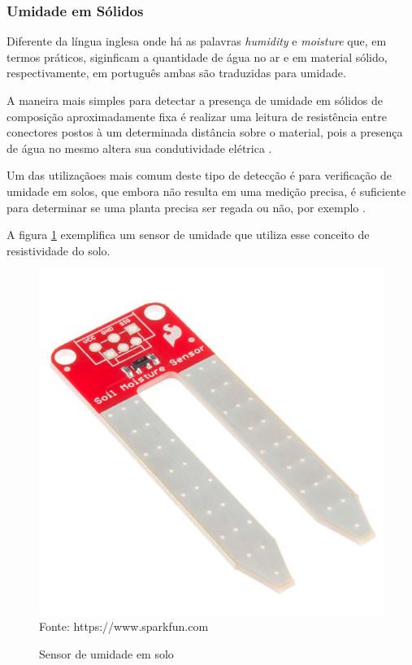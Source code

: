 \subsubsection{Umidade em Sólidos}
Diferente da língua inglesa onde há as palavras \textit{humidity} e \textit{moisture} que, em termos práticos,
siginficam a quantidade de água no ar e em material sólido, respectivamente, em português ambas são traduzidas
para umidade.

A maneira mais simples para detectar a presença de umidade em sólidos de composição aproximadamente fixa é
realizar uma leitura de resistência entre conectores postos à um determinada distância sobre o material, pois
a presença de água no mesmo altera sua condutividade elétrica \cite{sinclair2001,fraden2010}.

Um das utilizaçãoes mais comum deste tipo de detecção é para verificação de umidade em solos, que embora não
resulta em uma medição precisa, é suficiente para determinar se uma planta precisa ser regada ou não, por
exemplo \cite{sinclair2001}.

A figura \ref{figura:soil_moisture} exemplifica um sensor de umidade que utiliza esse conceito de
resistividade do solo.

\begin{figure}[h]
	\caption{Sensor de umidade em solo}
	\centering
	\includegraphics[scale=0.6]{../images/soil_moisture.jpg}
	\hspace{\linewidth}
	Fonte: https://www.sparkfun.com
	\label{figura:soil_moisture}
\end{figure}

